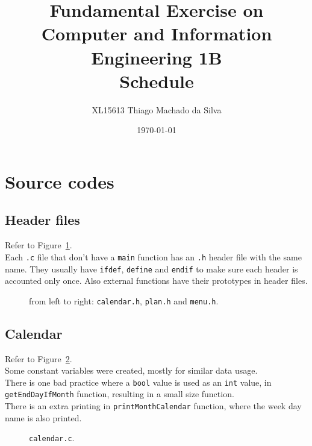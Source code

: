 \documentclass{article}
\title{Fundamental Exercise on Computer and Information Engineering 1B \\ Schedule}
\author{XL15613   Thiago Machado da Silva}
\date{\today}
\begin{document}
\maketitle

\section*{Source codes}
\subsection*{Header files}
Refer to Figure~\ref{fig:headers}. \\
Each {\tt .c} file that don't have a {\tt main} function has an {\tt .h} header file with the same name. They usually have {\tt ifdef}, {\tt define} and {\tt endif} to make sure each header is accounted only once. Also external functions have their prototypes in header files. \\
\begin{figure}[h]
  \centering
  \caption{from left to right: {\tt calendar.h}, {\tt plan.h} and {\tt menu.h}.}
  \label{fig:headers}
\end{figure}

\subsection*{Calendar}
Refer to Figure~\ref{fig:calendar}. \\
Some constant variables were created, mostly for similar data usage. \\
There is one bad practice where a {\tt bool} value is used as an {\tt int} value, in {\tt getEndDayIfMonth} function, resulting in a small size function. \\
There is an extra printing in {\tt printMonthCalendar} function, where the week day name is also printed. \\
\begin{figure}[h]
  \centering
  \caption{{\tt calendar.c}.}
  \label{fig:calendar}
\end{figure}
\end{document}
